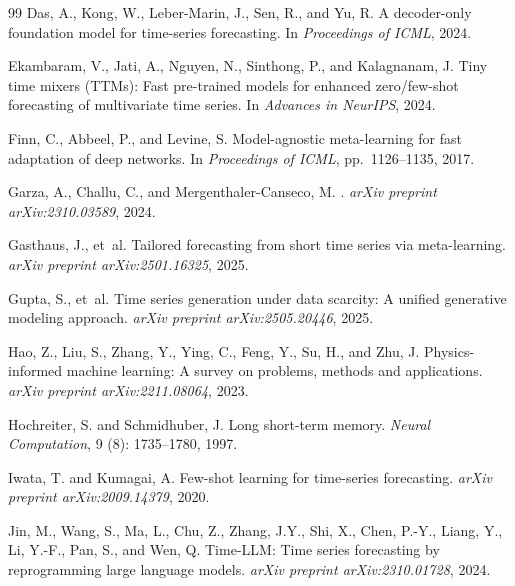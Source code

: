\begin{thebibliography}{99}
Das, A., Kong, W., Leber-Marin, J., Sen, R., and Yu, R.
\newblock A decoder-only foundation model for time-series forecasting.
\newblock In \emph{Proceedings of ICML}, 2024.

Ekambaram, V., Jati, A., Nguyen, N., Sinthong, P., and Kalagnanam, J.
\newblock Tiny time mixers ({TTMs}): Fast pre-trained models for enhanced zero/few-shot forecasting of multivariate time series.
\newblock In \emph{Advances in NeurIPS}, 2024.

Finn, C., Abbeel, P., and Levine, S.
\newblock Model-agnostic meta-learning for fast adaptation of deep networks.
\newblock In \emph{Proceedings of ICML}, pp.\ 1126--1135, 2017.

Garza, A., Challu, C., and Mergenthaler-Canseco, M.
.
\newblock \emph{arXiv preprint arXiv:2310.03589}, 2024.

Gasthaus, J., et~al.
\newblock Tailored forecasting from short time series via meta-learning.
\newblock \emph{arXiv preprint arXiv:2501.16325}, 2025.

Gupta, S., et~al.
\newblock Time series generation under data scarcity: A unified generative modeling approach.
\newblock \emph{arXiv preprint arXiv:2505.20446}, 2025.

Hao, Z., Liu, S., Zhang, Y., Ying, C., Feng, Y., Su, H., and Zhu, J.
\newblock Physics-informed machine learning: A survey on problems, methods and applications.
\newblock \emph{arXiv preprint arXiv:2211.08064}, 2023.

Hochreiter, S. and Schmidhuber, J.
\newblock Long short-term memory.
\newblock \emph{Neural Computation}, 9 (8): 1735--1780, 1997.

Iwata, T. and Kumagai, A.
\newblock Few-shot learning for time-series forecasting.
\newblock \emph{arXiv preprint arXiv:2009.14379}, 2020.

Jin, M., Wang, S., Ma, L., Chu, Z., Zhang, J.Y., Shi, X., Chen, P.-Y., Liang, Y., Li, Y.-F., Pan, S., and Wen, Q.
\newblock Time-{LLM}: Time series forecasting by reprogramming large language models.
\newblock \emph{arXiv preprint arXiv:2310.01728}, 2024.


\end{thebibliography}
